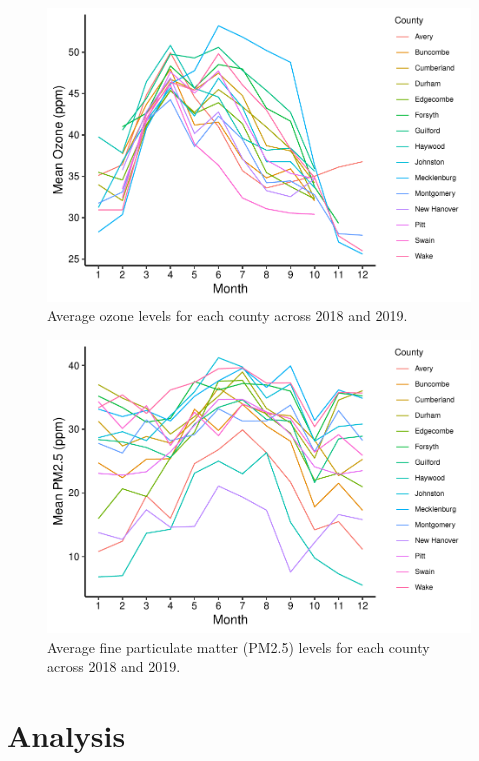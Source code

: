 \documentclass[
  12pt,
]{article}
\begin{document}
\begin{figure}
\centering
\includegraphics{Domeyer_FinalEDA_Sp22_files/figure-latex/exploration2-1.pdf}
\caption{Average ozone levels for each county across 2018 and 2019.}
\end{figure}

\begin{figure}
\centering
\includegraphics{Domeyer_FinalEDA_Sp22_files/figure-latex/exploration3-1.pdf}
\caption{Average fine particulate matter (PM2.5) levels for each county
across 2018 and 2019.}
\end{figure}

\newpage

\hypertarget{analysis}{%
\section{Analysis}\label{analysis}}
\end{document}
